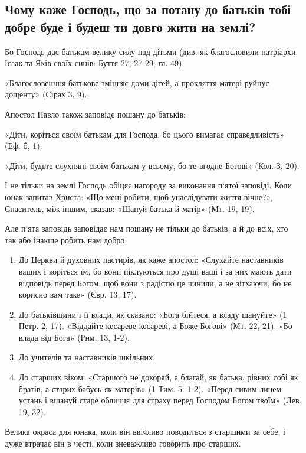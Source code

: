 \documentclass[main.tex]{subfiles}
\begin{document}
\subsection{Чому каже Господь, що за потану до батьків тобі добре буде і будеш ти довго жити на землі?}

Бо Господь дає батькам велику силу над дітьми (див. як благословили патріархи Ісаак та Яків своїх синів: Буття 27, 27-29; гл. 49).

«Благословенння батькове зміцняє доми дітей, а прокляття матері руйнує дощенту» (Сірах 3, 9).

Апостол Павло також заповідє пошану до батьків:

«Діти, коріться своїм батькам для Господа, бо цього вимагає справедливість» (Еф. б, 1).

«Діти, будьте слухняні своїм батькам у всьому, бо те вгодне Богові» (Кол. З, 20).

І не тільки на землі Господь обіцяє нагороду за виконання п`ятої заповіді. Коли юнак запитав Христа: «Що мені робити, щоб унаслідувати життя вічне?», Спаситель, між іншим, сказав: «Шануй батька й матір» (Мт. 19, 19).

Але п`ята заповідь заповідає нам пошану не тільки до батьків, а й до всіх, хто так або інакше робить нам добро:

\begin{enumerate}
    \item До Церкви й духовних пастирів, як каже апостол: «Слухайте наставників ваших і коріться їм, бо вони піклуються про душі ваші і за них мають дати відповідь перед Богом, щоб вони з радістю це чинили, а не зітхаючи, бо не корисно вам таке» (Євр. 13, 17).
    \item До батьківщини і її влади, як сказано: «Бога бійтеся, а владу шануйте» (1 Петр. 2, 17). «Віддайте кесареве
    кесареві, а Боже Богові» (Мт. 22, 21). «Бо влада від Бога» (Рим. 13, 1-2).
    \item До учителів та наставників шкільних.
    \item До старших віком. «Старшого не докоряй, а благай, як батька, рівних собі як братів, а старих бабусь як матерів» (1 Тим. 5. 1-2). «Перед сивим лицем устань і вшануй старе обличчя для страху перед Господом Богом твоїм» (Лев. 19, 32).
\end{enumerate}

Велика окраса для юнака, коли він ввічливо поводиться з старшими за себе, і дуже втрачає він в честі, коли зневажливо говорить про старших.
 
\end{document}
